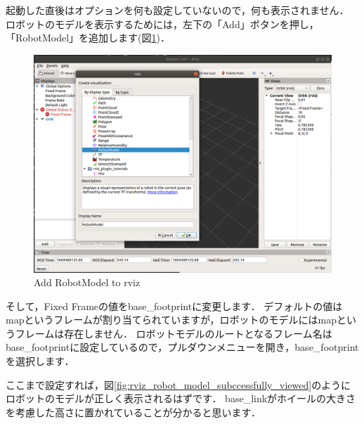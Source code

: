 \documentclass[{../../master}]{subfiles}
\begin{document}
起動した直後はオプションを何も設定していないので，何も表示されません．
ロボットのモデルを表示するためには，左下の「Add」ボタンを押し，「\textsf{RobotModel}」を追加します(図\ref{fig:rviz_add_robot_model})．

\begin{figure}[ht]
  \centering
  \includegraphics[width=100truemm]{images/rviz_add_robot_model.png}
  \caption{Add \textsf{RobotModel} to \textsf{rviz}}
  \label{fig:rviz_add_robot_model}
\end{figure}

\noindent
そして，\textsf{Fixed Frame}の値を\textsf{base\_footprint}に変更します．
デフォルトの値は\textsf{map}というフレームが割り当てられていますが，ロボットのモデルには\textsf{map}というフレームは存在しません．
ロボットモデルのルートとなるフレーム名は\textsf{base\_footprint}に設定しているので，プルダウンメニューを開き，\textsf{base\_footprint}を選択します．

ここまで設定すれば，図\ref{fig:rviz_robot_model_subccessfully_viewed}のようにロボットのモデルが正しく表示されるはずです．
\textsf{base\_link}がホイールの大きさを考慮した高さに置かれていることが分かると思います．
\end{document}
